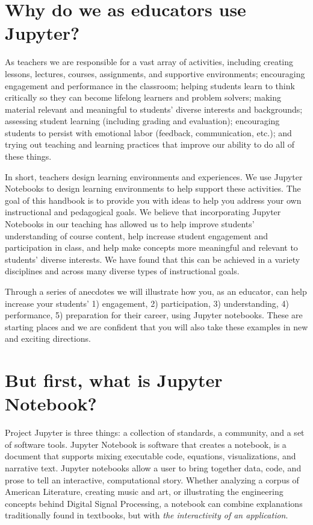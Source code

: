 \documentclass[]{book}
\begin{document}
\section{Why do we as educators use
Jupyter?}\label{why-do-we-as-educators-use-jupyter}

As teachers we are responsible for a vast array of activities, including
creating lessons, lectures, courses, assignments, and supportive
environments; encouraging engagement and performance in the classroom;
helping students learn to think critically so they can become lifelong
learners and problem solvers; making material relevant and meaningful to
students' diverse interests and backgrounds; assessing student learning
(including grading and evaluation); encouraging students to persist with
emotional labor (feedback, communication, etc.); and trying out teaching
and learning practices that improve our ability to do all of these
things.

In short, teachers design learning environments and experiences. We use
Jupyter Notebooks to design learning environments to help support these
activities. The goal of this handbook is to provide you with ideas to
help you address your own instructional and pedagogical goals. We
believe that incorporating Jupyter Notebooks in our teaching has allowed
us to help improve students' understanding of course content, help
increase student engagement and participation in class, and help make
concepts more meaningful and relevant to students' diverse interests. We
have found that this can be achieved in a variety disciplines and across
many diverse types of instructional goals.

Through a series of anecdotes we will illustrate how you, as an
educator, can help increase your students' 1) engagement, 2)
participation, 3) understanding, 4) performance, 5) preparation for
their career, using Jupyter notebooks. These are starting places and we
are confident that you will also take these examples in new and exciting
directions.

\section{But first, what is Jupyter
Notebook?}\label{but-first-what-is-jupyter-notebook}

Project Jupyter is three things: a collection of standards, a community,
and a set of software tools. Jupyter Notebook is software that creates a
notebook, is a document that supports mixing executable code, equations,
visualizations, and narrative text. Jupyter notebooks allow a user to
bring together data, code, and prose to tell an interactive,
computational story. Whether analyzing a corpus of American Literature,
creating music and art, or illustrating the engineering concepts behind
Digital Signal Processing, a notebook can combine explanations
traditionally found in textbooks, but with \emph{the interactivity of an
application}.
\end{document}
